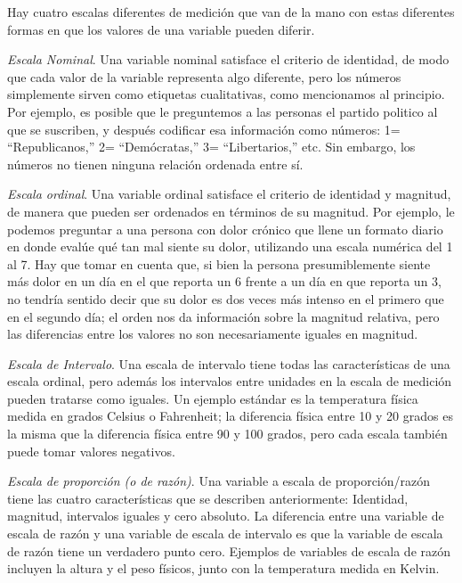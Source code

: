 \documentclass[
  12pt,
]{book}
\begin{document}
Hay cuatro escalas diferentes de medición que van de la mano con estas diferentes formas en que los valores de una variable pueden diferir.

\emph{Escala Nominal}. Una variable nominal satisface el criterio de identidad, de modo que cada valor de la variable representa algo diferente, pero los números simplemente sirven como etiquetas cualitativas, como mencionamos al principio. Por ejemplo, es posible que le preguntemos a las personas el partido politico al que se suscriben, y después codificar esa información como números: 1= ``Republicanos,'' 2= ``Demócratas,'' 3= ``Libertarios,'' etc. Sin embargo, los números no tienen ninguna relación ordenada entre sí.

\emph{Escala ordinal}. Una variable ordinal satisface el criterio de identidad y magnitud, de manera que pueden ser ordenados en términos de su magnitud. Por ejemplo, le podemos preguntar a una persona con dolor crónico que llene un formato diario en donde evalúe qué tan mal siente su dolor, utilizando una escala numérica del 1 al 7. Hay que tomar en cuenta que, si bien la persona presumiblemente siente más dolor en un día en el que reporta un 6 frente a un día en que reporta un 3, no tendría sentido decir que su dolor es dos veces más intenso en el primero que en el segundo día; el orden nos da información sobre la magnitud relativa, pero las diferencias entre los valores no son necesariamente iguales en magnitud.

\emph{Escala de Intervalo}. Una escala de intervalo tiene todas las características de una escala ordinal, pero además los intervalos entre unidades en la escala de medición pueden tratarse como iguales. Un ejemplo estándar es la temperatura física medida en grados Celsius o Fahrenheit; la diferencia física entre 10 y 20 grados es la misma que la diferencia física entre 90 y 100 grados, pero cada escala también puede tomar valores negativos.

\emph{Escala de proporción (o de razón)}. Una variable a escala de proporción/razón tiene las cuatro características que se describen anteriormente: Identidad, magnitud, intervalos iguales y cero absoluto. La diferencia entre una variable de escala de razón y una variable de escala de intervalo es que la variable de escala de razón tiene un verdadero punto cero. Ejemplos de variables de escala de razón incluyen la altura y el peso físicos, junto con la temperatura medida en Kelvin.
\end{document}
